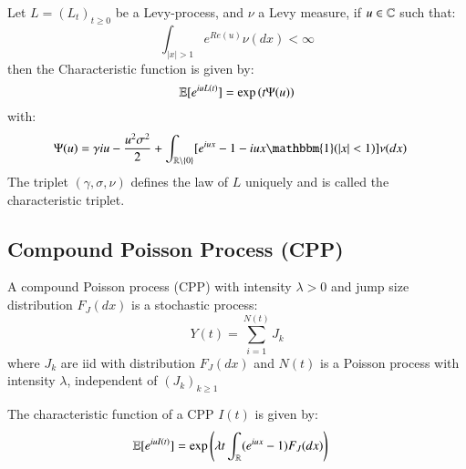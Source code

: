 \begin{theorem}
\label{thm: Levy_Khintchine}
Let $L = (L_{t})_{t\geq 0}$ be a Levy-process, and $\nu$ a Levy measure, if $u \in \mathbb{C}$ such that: 
$$
\int_{|x|>1}e^{Re(u)}\nu(dx) < \infty
$$
then the Characteristic function is given by:
$$
\mathbb{E}[e^{iuL(t)}] = \exp\left(
t\Psi(u)
\right)
$$
with: 
\begin{align*}
\Psi(u) &= \gamma iu - \frac{u^{2}\sigma^{2}}{2}
+ \int_{\R\setminus\{0\}}[e^{iux}-1-iux\mathbbm{1}(|x|<1)]\nu(dx)
\end{align*}
The triplet $(\gamma, \sigma, \nu)$ defines the law of $L$ uniquely and is called the characteristic triplet. 
\end{theorem} 



\newpage 

\subsection{Compound Poisson Process (CPP)}

\begin{definition}
\label{def: CPP}
A compound Poisson process (CPP) with intensity $\lambda > 0$ and jump size distribution $F_{J}(dx)$  is a stochastic process: 
$$
Y(t) = \sum_{i=1}^{N(t)}J_{k}
$$
where $J_{k}$ are iid with distribution $F_{J}(dx)$ and $N(t)$ is a Poisson process with intensity $\lambda$, independent of $(J_{k})_{k\geq 1}$
\end{definition}

\begin{proposition}
\label{prop: characteristic_function_CPP}
The characteristic function of a CPP $I(t)$ is given by: 
\begin{align*}
\mathbb{E}[e^{iuI(t)}] &= \exp\left(
\lambda t \int_{\mathbb{R}}(e^{iux}-1)F_{J}(dx)
\right)    
\end{align*}
\end{proposition} 

